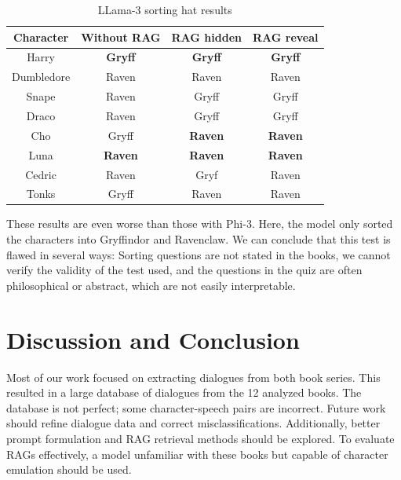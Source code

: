\documentclass[fleqn,moreauthors,10pt]{ds_report}
\begin{document}
\begin{table}[hbt]
	\caption{LLama-3 sorting hat results}
	\centering
	\begin{tabular}{c | c | c | c }
		Character  & Without RAG    & RAG hidden     & RAG reveal     \\ \hline
		Harry      & \textbf{Gryff} & \textbf{Gryff} & \textbf{Gryff} \\
		Dumbledore & Raven          & Raven          & Raven          \\ \hline
		Snape      & Raven          & Gryff          & Gryff          \\
		Draco      & Raven          & Gryff          & Gryff          \\ \hline
		Cho        & Gryff          & \textbf{Raven} & \textbf{Raven} \\
		Luna       & \textbf{Raven} & \textbf{Raven} & \textbf{Raven} \\ \hline
		Cedric     & Raven          & Gryf           & Raven          \\
		Tonks      & Gryff          & Raven          & Raven          \\
	\end{tabular}
	\label{tab:sorting_hat_results_llama}
\end{table}

These results are even worse than those with Phi-3.
Here, the model only sorted the characters into Gryffindor and Ravenclaw.
We can conclude that this test is flawed in several ways:
Sorting questions are not stated in the books,
we cannot verify the validity of the test used,
and the questions in the quiz are often philosophical or abstract, which are not easily interpretable.


\section*{Discussion and Conclusion}

Most of our work focused on extracting dialogues from both book series.
This resulted in a large database of dialogues from the 12 analyzed books.
The database is not perfect; some character-speech pairs are incorrect.
Future work should refine dialogue data and correct misclassifications.
Additionally, better prompt formulation and RAG retrieval methods should be explored.
To evaluate RAGs effectively, a model unfamiliar with these books but capable of character emulation should be used.




\end{document}

